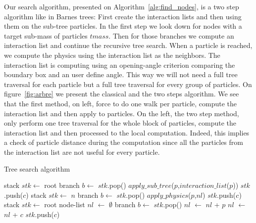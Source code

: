 Our search algorithm, presented on Algorithm~\ref{alg:find_nodes}, is a two step algorithm like in Barnes trees: First create the interaction lists and then using them on the sub-tree particles. 
In the first step we look down for nodes with a target sub-mass of particles $tmass$. 
Then for those branches we compute an interaction list and continue the recursive tree search. 
When a particle is reached, we compute the physics using the interaction list as the neighbors. 
The interaction list is computing using an opening-angle criterion comparing the boundary box and an user define angle. 
This way we will not need a full tree traversal for each particle but a full tree traversal for every group of particles.
On figure~\ref{fig:arbre} we present the classical and the two steps algorithm. 
We see that the first method, on left, force to do one walk per particle, compute the interaction list and then apply to particles. 
On the left, the two step method, only perform one tree traversal for the whole block of particles, compute the interaction list and then processed to the local computation. 
Indeed, this implies a check of particle distance during the computation since all the particles from the interaction list are not useful for every particle. 

\begin{algorithm}
\caption{Tree search algorithm}\label{alg:find_nodes}
\begin{algorithmic}[1]
\State stack $stk \leftarrow$ root
	\State branch $b \leftarrow$ $stk$.pop() 
			\State $apply\_sub\_tree$($p$,$interaction\_list$($p$))
		\EndFor
	\Else
			\State $stk$.push($c$)
		\EndFor
	\EndIf
\EndWhile
\EndProcedure
\State
{}
\State stack $stk \leftarrow$ $n$
	\State branch $b \leftarrow$ $stk$.pop() 
			\State $apply\_physics$($p$,$nl$)
		\EndFor
	\Else
			\State $stk$.push($c$)
		\EndFor
	\EndIf
\EndWhile
\EndProcedure
\State
{}
\State stack $stk \leftarrow$ root
\State node-list $nl$ $\leftarrow$ $\emptyset$
	\State branch $b \leftarrow$ $stk$.pop() 
				\State $nl$ $\leftarrow$ $nl$ + $p$
			\EndIf
		\EndFor
	\Else
				\State $nl$ $\leftarrow$ $nl$ + $c$
			\Else				
				\State $stk$.push($c$)
			\EndIf	
		\EndFor
	\EndIf
\EndWhile
\EndFunction
\end{algorithmic}
\end{algorithm}

